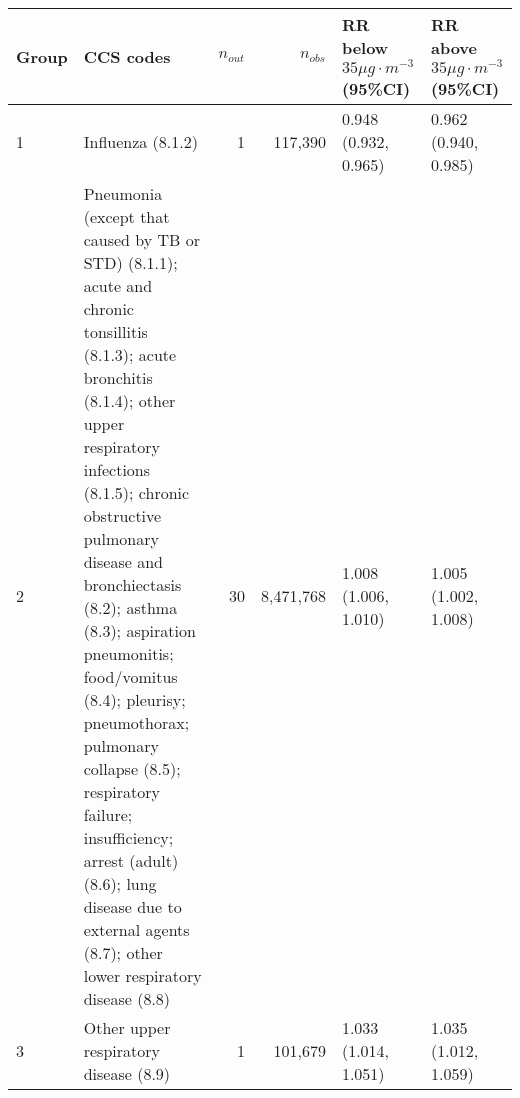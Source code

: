\begin{tabular}{lp{6.5cm}rrp{2.2cm}p{2.2cm}}
  \hline
Group & CCS codes & $n_{out}$ & $n_{obs}$ & RR below $35 \mu g \cdot m^{-3}$ (95\%CI) & RR above $35 \mu g \cdot m^{-3}$ (95\%CI) \\ 
  \hline
   1 & Influenza (8.1.2) &    1 & 117,390 & 0.948 (0.932, 0.965) & 0.962 (0.940, 0.985) \\ 
     2 & Pneumonia (except that caused by TB or STD) (8.1.1); acute and chronic tonsillitis (8.1.3); acute bronchitis (8.1.4); other upper respiratory infections (8.1.5); chronic obstructive pulmonary disease and bronchiectasis (8.2); asthma (8.3); aspiration pneumonitis; food/vomitus (8.4); pleurisy; pneumothorax; pulmonary collapse (8.5); respiratory failure; insufficiency; arrest (adult) (8.6); lung disease due to external agents (8.7); other lower respiratory disease (8.8) &   30 & 8,471,768 & 1.008 (1.006, 1.010) & 1.005 (1.002, 1.008) \\ 
     3 & Other upper respiratory disease (8.9) &    1 & 101,679 & 1.033 (1.014, 1.051) & 1.035 (1.012, 1.059) \\ 
   \hline
\end{tabular}

